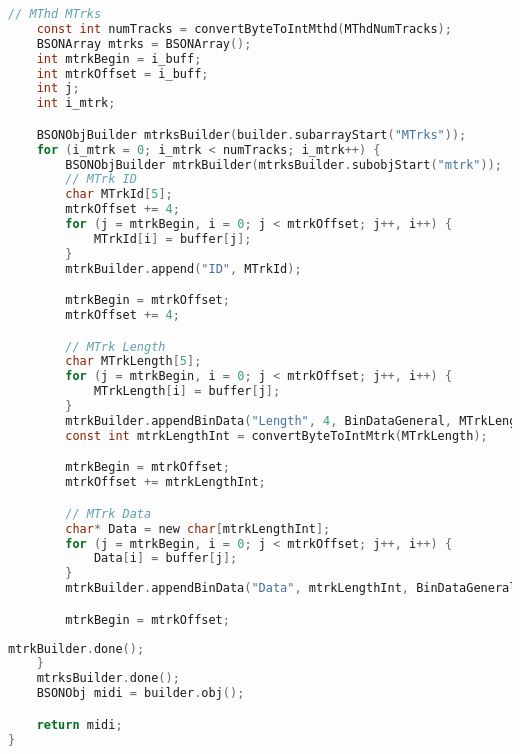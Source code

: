 \begin{lstlisting}[language=C, label=some-code, caption=Метод создания  документа MongoDB по спецификации MIDI (часть 2), label=lst:parser_midi2] 
    // MThd MTrks
    const int numTracks = convertByteToIntMthd(MThdNumTracks);
    BSONArray mtrks = BSONArray();
    int mtrkBegin = i_buff;
    int mtrkOffset = i_buff;
    int j;
    int i_mtrk;

    BSONObjBuilder mtrksBuilder(builder.subarrayStart("MTrks"));
    for (i_mtrk = 0; i_mtrk < numTracks; i_mtrk++) {
        BSONObjBuilder mtrkBuilder(mtrksBuilder.subobjStart("mtrk"));
        // MTrk ID
        char MTrkId[5];
        mtrkOffset += 4;
        for (j = mtrkBegin, i = 0; j < mtrkOffset; j++, i++) {
            MTrkId[i] = buffer[j];
        }
        mtrkBuilder.append("ID", MTrkId);

        mtrkBegin = mtrkOffset;
        mtrkOffset += 4;

        // MTrk Length
        char MTrkLength[5];
        for (j = mtrkBegin, i = 0; j < mtrkOffset; j++, i++) {
            MTrkLength[i] = buffer[j];
        }
        mtrkBuilder.appendBinData("Length", 4, BinDataGeneral, MTrkLength);
        const int mtrkLengthInt = convertByteToIntMtrk(MTrkLength);

        mtrkBegin = mtrkOffset;
        mtrkOffset += mtrkLengthInt;

        // MTrk Data
        char* Data = new char[mtrkLengthInt];
        for (j = mtrkBegin, i = 0; j < mtrkOffset; j++, i++) {
            Data[i] = buffer[j];
        }
        mtrkBuilder.appendBinData("Data", mtrkLengthInt, BinDataGeneral, Data);

        mtrkBegin = mtrkOffset;
\end{lstlisting}

\begin{lstlisting}[language=C, label=some-code, caption=Метод создания  документа MongoDB по спецификации MIDI (часть 3), label=lst:parser_midi3] 
        mtrkBuilder.done();
    }
    mtrksBuilder.done();
    BSONObj midi = builder.obj();

    return midi;
}
\end{lstlisting}

